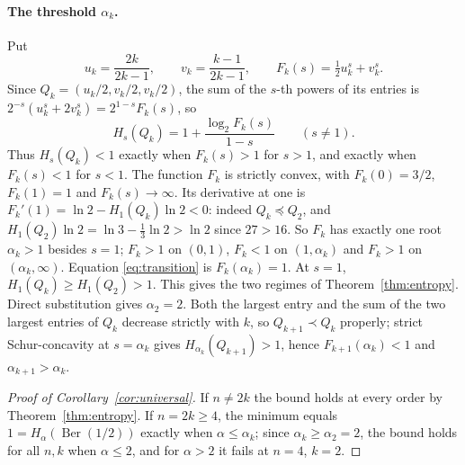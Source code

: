 \documentclass[11pt]{article}
\theoremstyle{remark}
\newcommand{\Ber}{\operatorname{Ber}}
\begin{document}
\paragraph{The threshold \(\alpha_k\).} Put
\[
 u_k=\frac{2k}{2k-1},\qquad v_k=\frac{k-1}{2k-1},\qquad
 F_k(s)=\tfrac12u_k^s+v_k^s .
\]
Since \(Q_k=(u_k/2,v_k/2,v_k/2)\), the sum of the \(s\)-th powers of its entries
is \(2^{-s}(u_k^s+2v_k^s)=2^{1-s}F_k(s)\), so
\[
 H_s(Q_k)=1+\frac{\log_2F_k(s)}{1-s}\qquad(s\ne1).
\]
Thus \(H_s(Q_k)<1\) exactly when \(F_k(s)>1\) for \(s>1\), and exactly when
\(F_k(s)<1\) for \(s<1\). The function \(F_k\) is strictly convex, with
\(F_k(0)=3/2\), \(F_k(1)=1\) and \(F_k(s)\to\infty\). Its derivative at one is
\(F_k'(1)=\ln2-H_1(Q_k)\ln2<0\): indeed \(Q_k\preceq Q_2\), and
\(H_1(Q_2)\ln2=\ln3-\tfrac13\ln2>\ln2\) since \(27>16\). So \(F_k\) has exactly
one root \(\alpha_k>1\) besides \(s=1\); \(F_k>1\) on \((0,1)\), \(F_k<1\) on
\((1,\alpha_k)\) and \(F_k>1\) on \((\alpha_k,\infty)\). Equation
\eqref{eq:transition} is \(F_k(\alpha_k)=1\). At \(s=1\),
\(H_1(Q_k)\ge H_1(Q_2)>1\). This gives the two regimes of
Theorem~\ref{thm:entropy}. Direct substitution gives \(\alpha_2=2\). Both the
largest entry and the sum of the two largest entries of \(Q_k\) decrease
strictly with \(k\), so \(Q_{k+1}\prec Q_k\) properly; strict
Schur-concavity at \(s=\alpha_k\) gives \(H_{\alpha_k}(Q_{k+1})>1\), hence
\(F_{k+1}(\alpha_k)<1\) and \(\alpha_{k+1}>\alpha_k\).

\begin{proof}[Proof of Corollary~\ref{cor:universal}]
If \(n\ne2k\) the bound holds at every order by Theorem~\ref{thm:entropy}. If
\(n=2k\ge4\), the minimum equals \(1=H_\alpha(\Ber(1/2))\) exactly when
\(\alpha\le\alpha_k\); since \(\alpha_k\ge\alpha_2=2\), the bound holds for all
\(n,k\) when \(\alpha\le2\), and for \(\alpha>2\) it fails at \(n=4\), \(k=2\).
\end{proof}
\end{document}
